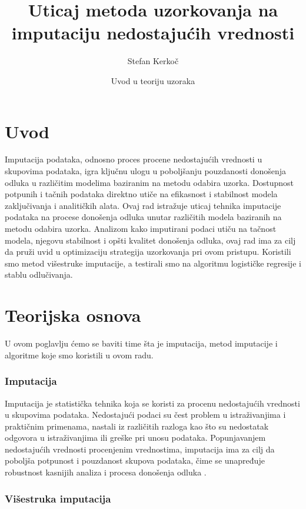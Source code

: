 \documentclass{article}
\title{Uticaj metoda uzorkovanja na imputaciju nedostajućih vrednosti}
\date{Uvod u teoriju uzoraka}
\author{Stefan Kerkoč}
\begin{document}
\maketitle

\newpage

\section*{Uvod}

Imputacija podataka, odnosno proces procene nedostajućih vrednosti u skupovima podataka, igra ključnu ulogu u poboljšanju pouzdanosti donošenja odluka u različitim modelima baziranim na metodu odabira uzorka. Dostupnost potpunih i tačnih podataka direktno utiče na efikasnost i stabilnost modela zaključivanja i analitičkih alata. Ovaj rad istražuje uticaj tehnika imputacije podataka na procese donošenja odluka unutar različitih modela baziranih na metodu odabira uzorka. Analizom kako imputirani podaci utiču na tačnost modela, njegovu stabilnost i opšti kvalitet donošenja odluka, ovaj rad ima za cilj da pruži uvid u optimizaciju strategija uzorkovanja pri ovom pristupu. Koristili smo metod višestruke imputacije, a testirali smo na algoritmu logističke regresije i stablu odlučivanja.

\newpage

\section*{Teorijska osnova}

U ovom poglavlju ćemo se baviti time šta je imputacija, metod imputacije i algoritme koje smo koristili u ovom radu. 

\subsubsection*{Imputacija}

Imputacija je statistička tehnika koja se koristi za procenu nedostajućih vrednosti u skupovima podataka. Nedostajući podaci su čest problem u istraživanjima i praktičnim primenama, nastali iz različitih razloga kao što su nedostatak odgovora u istraživanjima ili greške pri unosu podataka. Popunjavanjem nedostajućih vrednosti procenjenim vrednostima, imputacija ima za cilj da poboljša potpunost i pouzdanost skupova podataka, čime se unapređuje robustnost kasnijih analiza i procesa donošenja odluka \cite{rubin1987}. 

\subsubsection*{Višestruka imputacija}
\end{document}
